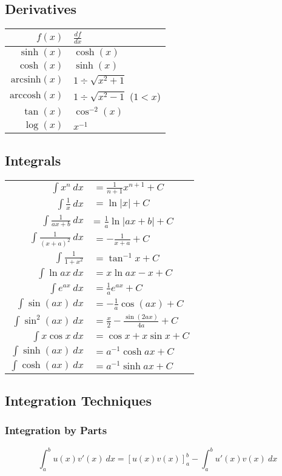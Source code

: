 \subsection{Derivatives}
\begin{tabular}{r|l}
	$f(x)$ & $\frac{df}{dx}$ \\
	\hline
	$\sinh(x)$ & $\cosh(x)$ \\
	$\cosh(x)$ & $\sinh(x)$ \\
	$\mathrm{arcsinh}(x)$ & $1 \div \sqrt{x^2+1}$ \\
	$\mathrm{arccosh}(x)$ & $1 \div \sqrt{x^2 - 1}$ ($1<x$) \\
	$\tan(x)$ & $\cos^{-2}(x)$ \\
	$\log(x)$ & $x^{-1}$
\end{tabular}

\subsection{Integrals}
\begin{tabular}[h]{rl}
	$\int x^n\ dx$ & $= \frac{1}{n+1}x^{n+1} + C$ \\
	$\int \frac{1}{x}\ dx$ & $= \ln |x| + C$ \\
	$\int \frac{1}{ax + b}\ dx$ & = $\frac{1}{a} \ln |ax+b| + C$ \\
	$\int \frac{1}{(x+a)^2}\ dx$ & $= -\frac{1}{x+a} + C$ \\
	$\int \frac{1}{1 + x^2}$ & $= \tan^{-1} x + C$ \\
	$\int \ln ax\ dx$ & $= x\ln ax - x + C$ \\
	$\int e^{ax}\ dx$ & $= \frac{1}{a} e^{ax} + C$ \\
	$\int \sin(ax)\ dx$ & $= -\frac{1}{a}\cos(ax) + C$ \\
	$\int \sin^2(ax)\ dx$ & $= \frac{x}{2}-\frac{\sin(2ax)}{4a} + C$ \\
	$\int x\cos x\ dx$ & $= \cos x + x\sin x + C$ \\
	$\int \sinh(ax)\ dx$ & $= a^{-1}\cosh{ax} + C$ \\
	$\int \cosh(ax)\ dx$ & $= a^{-1}\sinh{ax} + C$ \\
\end{tabular}

\subsection{Integration Techniques}
\subsubsection{Integration by Parts}
\begin{equation*}
	\int_a^b u(x)v'(x)\ dx = \left[ u(x)v(x) \right]_a^b-\int_a^bu'(x)v(x)\ dx
\end{equation*}

